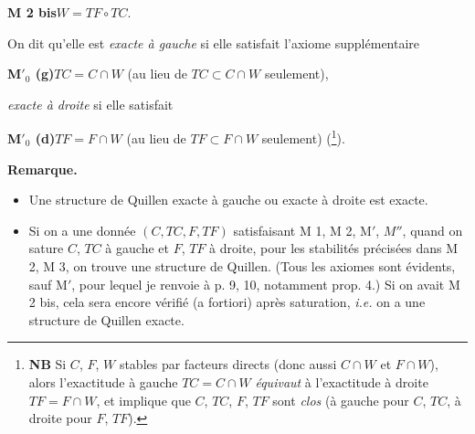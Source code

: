 \clearpage
{}

\noindent\textbf{M 2 bis}\qquad $W = TF \circ TC$.

\noindent On dit qu'elle est \textit{exacte à gauche} si elle satisfait l'axiome supplémentaire

\noindent\textbf{M$'_0$ (g)}\qquad $TC = C \cap W$ (au lieu de $TC \subset C \cap W$ seulement),

\noindent\textit{exacte à droite} si elle satisfait

\noindent\textbf{M$'_0$ (d)}\qquad $TF = F \cap W$ (au lieu de $TF \subset F \cap W$ seulement) (\footnote[20]{\textbf{NB} Si $C$, $F$, $W$ stables par facteurs directs (donc aussi $C \cap W$ et $F \cap W$), alors l'exactitude à gauche $TC = C \cap W$ \textit{équivaut} à l'exactitude à droite $TF = F \cap W$, et implique que $C$, $TC$, $F$, $TF$ sont \textit{clos} (à gauche pour $C$, $TC$, à droite pour $F$, $TF$).}).

\noindent\textbf{Remarque.}
\begin{itemize}[leftmargin=3em]
\item[a)] Une structure de Quillen exacte à gauche ou exacte à droite est exacte.
\item[b)] Si on a une donnée $(C, TC, F, TF)$ satisfaisant M 1, M 2, M$'$, $M''$, quand on sature $C$, $TC$ à gauche et $F$, $TF$ à droite, pour les stabilités précisées dans M 2, M 3, on trouve une structure de Quillen. (Tous les axiomes sont évidents, sauf M$'$, pour lequel je renvoie à p. 9, 10, notamment prop. 4.) Si on avait M 2 bis, cela sera encore vérifié (a fortiori) après saturation, \textit{i.e.} on a une structure de Quillen exacte.
\end{itemize}

